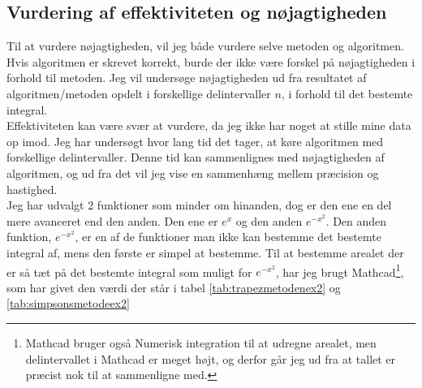 \documentclass[12pt]{article}
\numberwithin{equation}{section}
\begin{document}
\subsection{Vurdering af effektiviteten og nøjagtigheden}
Til at vurdere nøjagtigheden, vil jeg både vurdere selve metoden og algoritmen. Hvis algoritmen er skrevet korrekt, burde der ikke være forskel på nøjagtigheden i forhold til metoden. Jeg vil undersøge nøjagtigheden ud fra resultatet af algoritmen/metoden opdelt i forskellige delintervaller $n$, i forhold til det bestemte integral.
\\Effektiviteten kan være svær at vurdere, da jeg ikke har noget at stille mine data op imod. Jeg har undersøgt hvor lang tid det tager, at køre algoritmen med forskellige delintervaller. Denne tid kan sammenlignes med nøjagtigheden af algoritmen, og ud fra det vil jeg vise en sammenhæng mellem præcision og hastighed.\\
Jeg har udvalgt 2 funktioner som minder om hinanden, dog er den ene en del mere avanceret end den anden. Den ene er $e^x$ og den anden $e^{-x^2}$. Den anden funktion, $e^{-x^2}$, er en af de funktioner man ikke kan bestemme det bestemte integral af, mens den første er simpel at bestemme. Til at bestemme arealet der er så tæt på det bestemte integral som muligt for $e^{-x^2}$, har jeg brugt Mathcad\footnote{Mathcad bruger også Numerisk integration til at udregne arealet, men delintervallet i Mathcad er meget højt, og derfor går jeg ud fra at tallet er præcist nok til at sammenligne med.}, som har givet den værdi der står i tabel \ref{tab:trapezmetodenex2} og \ref{tab:simpsonsmetodeex2}
\end{document}
